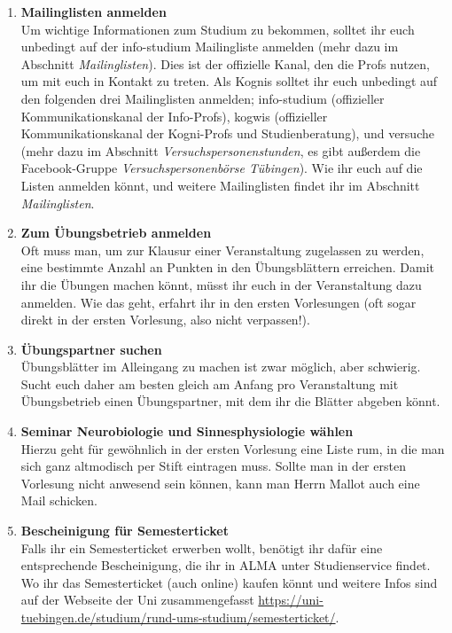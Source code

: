 \begin{enumerate}[label=$\bigcirc$]
  	\item \textbf{Mailinglisten anmelden}\\
  	\ifinfo
  		Um wichtige Informationen zum Studium zu bekommen, solltet ihr euch unbedingt auf der info-studium Mailingliste anmelden (mehr dazu im Abschnitt \textit{Mailinglisten}). Dies ist der offizielle Kanal, den die Profs nutzen, um mit euch in Kontakt zu treten.
  	\else
  		Als Kognis solltet ihr euch unbedingt auf den folgenden drei Mailinglisten anmelden; info-studium (offizieller Kommunikationskanal der Info-Profs), kogwis (offizieller Kommunikationskanal der Kogni-Profs und Studienberatung), und versuche (mehr dazu im Abschnitt \textit{Versuchspersonenstunden}, es gibt außerdem die Facebook-Gruppe \textit{Versuchspersonenbörse Tübingen}). Wie ihr euch auf die Listen anmelden könnt, und weitere Mailinglisten findet ihr im Abschnitt \textit{Mailinglisten}.
  	\fi
  	
	\item \textbf{Zum Übungsbetrieb anmelden} \\
	  	Oft muss man, um zur Klausur einer Veranstaltung zugelassen zu werden, eine bestimmte Anzahl an Punkten in den Übungsblättern erreichen. Damit ihr die Übungen machen könnt, müsst ihr euch in der Veranstaltung dazu anmelden. Wie das geht, erfahrt ihr in den ersten Vorlesungen (oft sogar direkt in der ersten Vorlesung, also nicht verpassen!).
	  	
  	\item \textbf{Übungspartner suchen} \\
	  	Übungsblätter im Alleingang zu machen ist zwar möglich, aber schwierig. Sucht euch daher am besten gleich am Anfang pro Veranstaltung mit Übungsbetrieb einen Übungspartner, mit dem ihr die Blätter abgeben könnt.
	  	
	 \ifinfo
	 \else
	 \item  \textbf{Seminar Neurobiologie und Sinnesphysiologie wählen}\\
	 	Hierzu geht für gewöhnlich in der ersten Vorlesung eine Liste rum, in die man sich ganz altmodisch per Stift eintragen muss. Sollte man in der ersten Vorlesung nicht anwesend sein können, kann man Herrn Mallot auch eine Mail schicken.
	 \fi

	\item \textbf{Bescheinigung für Semesterticket} \\	
		Falls ihr ein Semesterticket erwerben wollt, benötigt ihr dafür eine entsprechende Bescheinigung, die ihr in ALMA unter Studienservice findet. Wo ihr das Semesterticket (auch online) kaufen könnt und weitere Infos sind auf der Webseite der Uni zusammengefasst \url{https://uni-tuebingen.de/studium/rund-ums-studium/semesterticket/}.
	

\end{enumerate}
